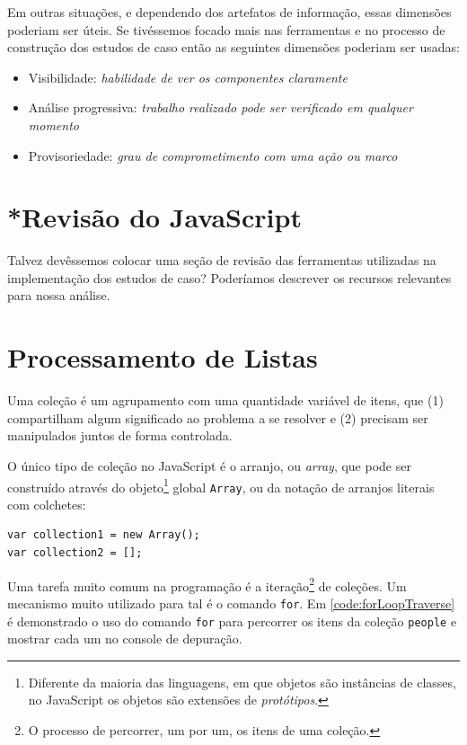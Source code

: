 Em outras situações, e dependendo dos artefatos de informação, essas dimensões
poderiam ser úteis. Se tivéssemos focado mais nas ferramentas e no processo de
construção dos estudos de caso então as seguintes dimensões poderiam ser usadas:

\begin{itemize}
\item Visibilidade: \emph{habilidade de ver os componentes claramente}
\item Análise progressiva: \emph{trabalho realizado pode ser verificado em qualquer
momento}
\item Provisoriedade: \emph{grau
de comprometimento com uma ação ou marco}
\end{itemize}
\section{*Revisão do JavaScript}
\label{sec:orgb07ad46}
Talvez devêssemos colocar uma seção de revisão das ferramentas utilizadas na
implementação dos estudos de caso? Poderíamos descrever os recursos relevantes
para nossa análise.
\section{Processamento de Listas}
\label{sec:org3c19642}

Uma coleção é um agrupamento com uma quantidade variável de itens, que (1)
compartilham algum significado ao problema a se resolver e (2) precisam ser
manipulados juntos de forma controlada.

O único tipo de coleção no JavaScript é o arranjo, ou \emph{array}, que pode ser
construído através do objeto\footnote{Diferente da maioria das linguagens, em que objetos são
instâncias de classes, no JavaScript os objetos são extensões de \emph{protótipos}.} global \texttt{Array}, ou da
notação de arranjos literais com colchetes:

\begin{listing}[htbp]
\caption{Criando coleções}
\begin{verbatim}
var collection1 = new Array();
var collection2 = [];
\end{verbatim}
\end{listing}

Uma tarefa muito comum na programação é a iteração\footnote{O processo de percorrer, um por um, os itens de uma coleção.} de coleções.
Um mecanismo muito utilizado para tal é o comando \texttt{for}. Em
\ref{code:forLoopTraverse} é demonstrado o uso do comando \texttt{for} para
percorrer os itens da coleção \texttt{people} e mostrar cada um no console de
depuração.

